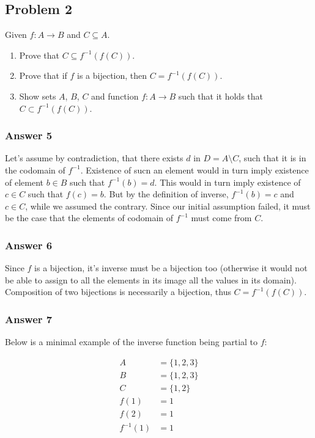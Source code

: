 \documentclass[11pt]{article}
\begin{document}
\subsection{Problem 2}
\label{sec-1-2}
Given $f : A \to B$ and $C \subseteq A$.

\begin{enumerate}
\item Prove that $C \subseteq f^{-1}(f(C))$.
\item Prove that if $f$ is a bijection, then $C = f^{-1}(f(C))$.
\item Show sets $A$, $B$, $C$ and function $f:A \to B$ such that it holds that
      $C \subset f^{-1}(f(C))$.
\end{enumerate}

\subsubsection{Answer 5}
\label{sec-1-2-1}
Let's assume by contradiction, that there exists $d$ in $D = A \setminus C$,
such that it is in the codomain of $f^{-1}$.  Existence of sucn an element
would in turn imply existence of element $b \in B$ such that $f^{-1}(b) = d$.
This would in turn imply existence of $c \in C$ such that $f(c) = b$.
But by the definition of inverse, $f^{-1}(b)=c$ and $c \in C$, while we
assumed the contrary.  Since our initial assumption failed, it must be the
case that the elements of codomain of $f^{-1}$ must come from $C$.
\subsubsection{Answer 6}
\label{sec-1-2-2}
Since $f$ is a bijection, it's inverse must be a bijection too (otherwise it
would not be able to assign to all the elements in its image all the values in
its domain).  Composition of two bijections is necessarily a bijection, thus
$C = f^{-1}(f(C))$.
\subsubsection{Answer 7}
\label{sec-1-2-3}
Below is a minimal example of the inverse function being partial to $f$:

\begin{align*}
  A &= \{1, 2, 3\} \\
  B &= \{1, 2, 3\} \\
  C &= \{1, 2\} \\
  f(1) &= 1 \\
  f(2) &= 1 \\
  f^{-1}(1) &= 1
\end{align*}
\end{document}
